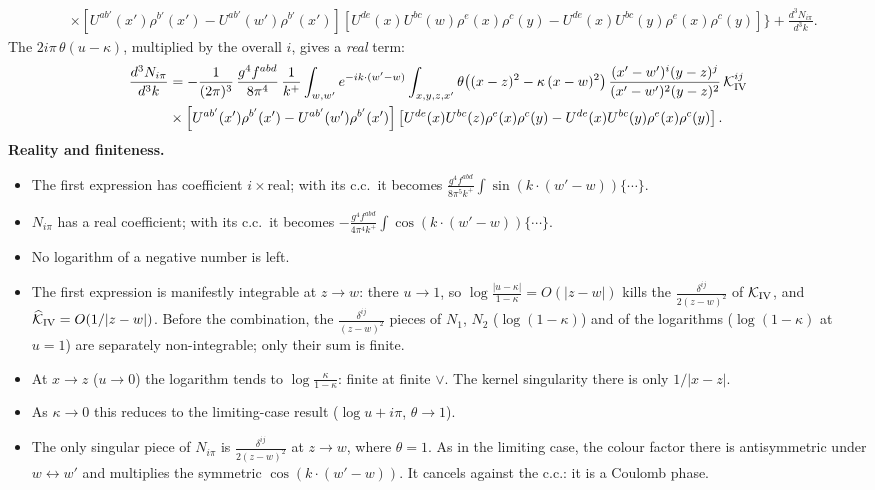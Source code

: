 \documentclass[9pt]{article}
\numberwithin{equation}{section}
\begin{document}
{\begin{align}
&\times\left[U^{ab'}(x')\rho^{b'}(x')-U^{ab'}(w')\rho^{b'}(x')\right]\left[U^{de}(x)U^{bc}(w)\rho^{e}(x)\rho^{c}(y)-U^{de}(x)U^{bc}(y)\rho^{e}(x)\rho^{c}(y)\right]\Bigg\}
+\frac{d^{3}N_{i\pi}}{d^{3}k}.
\end{align}
The $2i\pi\,\theta(u-\kappa)$, multiplied by the overall $i$, gives a \emph{real} term:
\begin{align}
\frac{d^{3}N_{i\pi}}{d^{3}k}&=-\frac{1}{(2\pi)^{3}}\,\frac{g^{4}f^{abd}}{8\pi^{4}}\,\frac{1}{k^{+}}\int_{w,w'}e^{-ik\cdot(w'-w)}\int_{x,y,z,x'}\theta\big((x-z)^{2}-\kappa\,(x-w)^{2}\big)\,\frac{(x'-w')^{i}(y-z)^{j}}{(x'-w')^{2}(y-z)^{2}}\,\mathcal K^{ij}_{\rm IV}\notag\\
&\times\left[U^{ab'}(x')\rho^{b'}(x')-U^{ab'}(w')\rho^{b'}(x')\right]\left[U^{de}(x)U^{bc}(z)\rho^{e}(x)\rho^{c}(y)-U^{de}(x)U^{bc}(y)\rho^{e}(x)\rho^{c}(y)\right].
\end{align}
\textbf{Reality and finiteness.}
\begin{itemize}
\item The first expression has coefficient $i\times$real; with its c.c.\ it becomes $\frac{g^{4}f^{abd}}{8\pi^{5}k^{+}}\int\sin(k\cdot(w'-w))\{\cdots\}$.
\item $N_{i\pi}$ has a real coefficient; with its c.c.\ it becomes $-\frac{g^{4}f^{abd}}{4\pi^{4}k^{+}}\int\cos(k\cdot(w'-w))\{\cdots\}$.
\item No logarithm of a negative number is left.
\item The first expression is manifestly integrable at $z\to w$: there $u\to1$, so $\log\frac{|u-\kappa|}{1-\kappa}=O(|z-w|)$ kills the $\frac{\delta^{ij}}{2(z-w)^{2}}$ of $\mathcal K_{\rm IV}$, and $\widehat{\mathcal K}_{\rm IV}=O(1/|z-w|)$. Before the combination, the $\frac{\delta^{ij}}{(z-w)^{2}}$ pieces of $N_{1}$, $N_{2}$ ($\log(1-\kappa)$) and of the logarithms ($\log(1-\kappa)$ at $u=1$) are separately non-integrable; only their sum is finite.
\item At $x\to z$ ($u\to0$) the logarithm tends to $\log\frac{\kappa}{1-\kappa}$: finite at finite $\vee$. The kernel singularity there is only $1/|x-z|$.
\item As $\kappa\to0$ this reduces to the limiting-case result ($\log u+i\pi$, $\theta\to1$).
\item The only singular piece of $N_{i\pi}$ is $\frac{\delta^{ij}}{2(z-w)^{2}}$ at $z\to w$, where $\theta=1$. As in the limiting case, the colour factor there is antisymmetric under $w\leftrightarrow w'$ and multiplies the symmetric $\cos(k\cdot(w'-w))$. It cancels against the c.c.: it is a Coulomb phase.
\end{itemize}}
\end{document}
